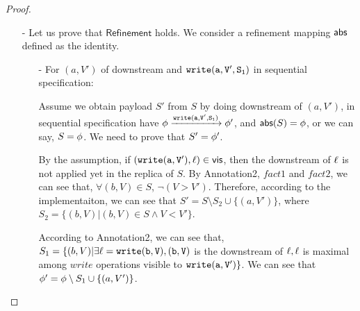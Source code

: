 \begin {proof}
\begin{itemize}
\begin{itemize}
    \item[-] For case of applying downstream $(a,V')$ on replica $\arep$: We only need to consider Annotation2. Let $S$ and $S'$ be the payload of replica $\arep$ of $\aglobalstate$ and $\aglobalstate'$, respectively.

        By the {} assumption, if $\alabelshort[{\tt write}]{a,V'}$ is visible to a operation $\alabel$, then $\alabel$ does not applied in $\aglobalstate'$ yet. By Annotation2, $fact1$ and $fact2$, we know that, $\forall (b,V) \in S$, we have $\neg(V > V')$. Therefore, we have $S' = S \setminus \{ (b,V) \vert (b,V) \in S \wedge V < V' \} \cup \{ (a,V') \}$. By $fact1$ and $fact2$, each element in $\{ (b,V) \vert (b,V) \in S \wedge V < V' \}$ is visible to $\alabelshort[{\tt write}]{a,V'}$, and they are not in $S'$. Therefore, Annotation2 still holds in $\aglobalstate'$.
    \end{itemize}

\item[-] Let us prove that $\mathsf{Refinement}$ holds. We consider a refinement mapping $\mathsf{abs}$ defined as the identity.

    \begin{itemize}
    \setlength{\itemsep}{0.5pt}
    \item[-] For $(a,V')$ of downstream and $\alabelshort[{\tt write}]{a,V',S_1}$ in sequential specification:

    Assume we obtain payload $S'$ from $S$ by doing downstream of $(a,V')$, in sequential specification have $\abstate \xrightarrow{\alabelshort[{\tt write}]{a,V',S_1}} \abstate'$, and $\mathsf{abs}(S) = \phi$, or we can say, $S = \phi$. We need to prove that $S' = \phi'$.

    By the {} assumption, if $(\alabelshort[{\tt write}]{a,V'},\alabel) \in \avisord$, then the downstream of $\alabel$ is not applied yet in the replica of $S$. By Annotation2, $fact1$ and $fact2$, we can see that, $\forall (b,V) \in S$, $\neg(V > V')$. Therefore, according to the implementaiton, we can see that $S' = S \setminus S_2 \cup \{ (a,V') \}$, where $S_2 = \{ (b,V) \vert (b,V) \in S \wedge V < V' \}$.

    According to Annotation2, we can see that, $S_1 = \{ (b,V) \vert \exists \alabel = \alabelshort[{\tt write}]{b,V}, (b,V)$ is the downstream of $\ell, \ell$ is maximal among $write$ operations visible to $\alabelshort[{\tt write}]{a,V'} \}$. We can see that $\phi' = \phi \setminus S_1 \cup \{ (a,V') \}$.


\end{itemize}
\end{itemize}
\end{proof}

